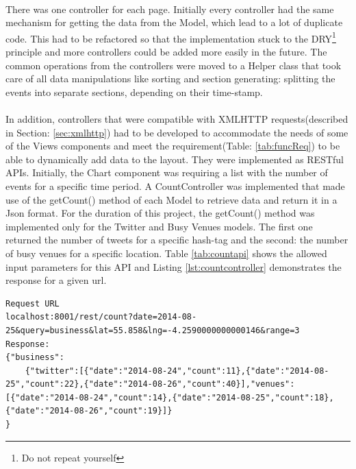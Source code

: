 \documentclass{l4proj}
\begin{document}
\paragraph{}
There was one controller for each page. Initially every controller had the same mechanism for getting the data from the Model, which lead to a lot of duplicate code. This had to be refactored so that the implementation stuck to the DRY\footnote{Do not repeat yourself} principle and more controllers could be added more easily in the future. The common operations from the controllers were moved to a Helper class that took care of all data manipulations like sorting and section generating: splitting the events into separate sections, depending on their time-stamp.

\paragraph{} 
In addition, controllers that were compatible with XMLHTTP requests(described in Section: \ref{sec:xmlhttp}) had to be developed to accommodate the needs of some of the View\textquotesingle s components and meet the requirement(Table: \ref{tab:funcReq}) to be able to dynamically add data to the layout. They were implemented as RESTful APIs. Initially, the Chart component was requiring a list with the number of events for a specific time period. A CountController was implemented that made use of the getCount() method of each Model to retrieve data and return it in a Json format. For the duration of this project, the getCount() method was implemented only for the Twitter and Busy Venues models. The first one returned the number of tweets for a specific hash-tag and the second: the number of busy venues for a specific location. Table \ref{tab:countapi} shows the allowed input parameters for this API and Listing \ref{lst:countcontroller} demonstrates the response for a given url. 

\begin{lstlisting}[caption={Count API Request and Response},label={lst:countcontroller}]
Request URL
localhost:8001/rest/count?date=2014-08-25&query=business&lat=55.858&lng=-4.2590000000000146&range=3
Response:
{"business":
	{"twitter":[{"date":"2014-08-24","count":11},{"date":"2014-08-25","count":22},{"date":"2014-08-26","count":40}],"venues":[{"date":"2014-08-24","count":14},{"date":"2014-08-25","count":18},{"date":"2014-08-26","count":19}]}
}
\end{lstlisting}
\end{document}
